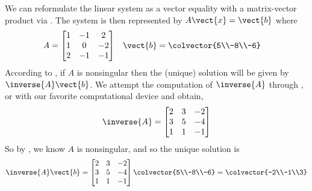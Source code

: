 We can reformulate the linear system as a vector equality with a matrix-vector product via .  The system is then represented by $A\vect{x}=\vect{b}$ where
%
\begin{align*}
A&=
\begin{bmatrix}
1 & -1 & 2 \\
1 & 0 & -2\\
2 & -1 & -1
\end{bmatrix}
&
\vect{b}
&=\colvector{5\\-8\\-6}
\end{align*}
%
According to , if $A$ is nonsingular then the (unique) solution will be given by $\inverse{A}\vect{b}$.  We attempt the computation of $\inverse{A}$ through , or with our favorite computational device and obtain,
%
\begin{align*}
\inverse{A}=
\begin{bmatrix}
 2 & 3 & -2 \\
 3 & 5 & -4 \\
 1 & 1 & -1
\end{bmatrix}
%
\end{align*}
%
So by , we know $A$ is nonsingular, and so the unique solution is
%
\begin{align*}
\inverse{A}\vect{b}
=
\begin{bmatrix}
 2 & 3 & -2 \\
 3 & 5 & -4 \\
 1 & 1 & -1
\end{bmatrix}
\colvector{5\\-8\\-6}
=
\colvector{-2\\-1\\3}
\end{align*}
